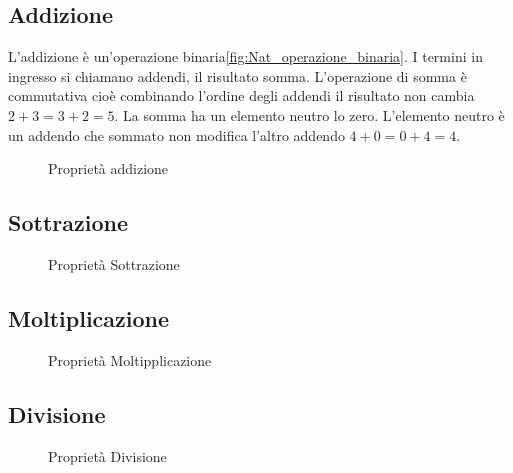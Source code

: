 \subsection{Addizione}
\label{sec:NumerinatADD}
L'addizione è un'operazione binaria\nobs\vref{fig:Nat_operazione_binaria}. I termini in ingresso si chiamano addendi\nobs{}, il risultato somma. L'operazione di  somma è commutativa cioè combinando l'ordine degli addendi il risultato non cambia $2+3=3+2=5$. La somma ha un elemento neutro lo zero. L'elemento neutro è un addendo che sommato non modifica l'altro addendo $4+0=0+4=4$. 
\begin{figure} %
	\centering

	\caption{Proprietà addizione}
	\label{fig:ProprietaAddizione}\end{figure}
\subsection{Sottrazione}
\label{sec:NumerinatDiff}
\begin{figure} %
	\centering

	\caption{Proprietà Sottrazione}
	\label{fig:ProprietaSottrazione}\end{figure}
\subsection{Moltiplicazione}
\label{sec:NumerinatMolt}
\begin{figure} %
	\centering

	\caption{Proprietà Moltipplicazione}
	\label{fig:ProprietaMoltiplicazione}\end{figure}
\subsection{Divisione}
\label{sec:Numerinatdiv}
\begin{figure} %
	\centering

	\caption{Proprietà Divisione}
	\label{fig:ProprietaDivisione}\end{figure}
